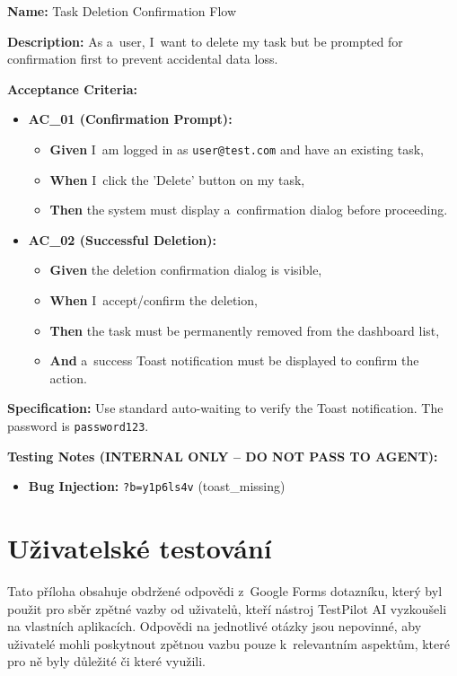 \documentclass[czech, ing, kiv, he, iso690numb, viewonly]{fasthesis}
\begin{document}
\begin{tcolorbox}[breakable, colback=gray!4, colframe=black!35, boxrule=0.4pt, arc=2pt, boxsep=1pt, left=3pt, right=3pt, top=2pt, bottom=2pt, before skip=6pt, after skip=6pt, fontupper=\small, title={US-08 -- Task Deletion Confirmation Flow}]
\textbf{Name:} Task Deletion Confirmation Flow

\textbf{Description:} As a~user, I~want to delete my task but be prompted for confirmation first to prevent accidental data loss.

\textbf{Acceptance Criteria:}
\begin{itemize}
    \item \textbf{AC\_01 (Confirmation Prompt):}
    \begin{itemize}
      \item \textbf{Given} I~am logged in as \texttt{user@test.com} and have an existing task,
      \item \textbf{When} I~click the 'Delete' button on my task,
      \item \textbf{Then} the system must display a~confirmation dialog before proceeding.
    \end{itemize}
    \item \textbf{AC\_02 (Successful Deletion):}
    \begin{itemize}
      \item \textbf{Given} the deletion confirmation dialog is visible,
      \item \textbf{When} I~accept/confirm the deletion,
      \item \textbf{Then} the task must be permanently removed from the dashboard list,
      \item \textbf{And} a~success Toast notification must be displayed to confirm the action.
    \end{itemize}
\end{itemize}

\textbf{Specification:} Use standard auto-waiting to verify the Toast notification. The password is \texttt{password123}.

\textbf{\textcolor{BrickRed}{Testing Notes (INTERNAL ONLY -- DO NOT PASS TO AGENT):}}
\begin{itemize}
    \item \textbf{Bug Injection:} \texttt{?b=y1p6ls4v} (toast\_missing)
\end{itemize}
\end{tcolorbox}

\chapter{Uživatelské testování}\label{app:userTesting}
Tato příloha obsahuje obdržené odpovědi z~Google Forms dotazníku,
který byl použit pro sběr zpětné vazby od uživatelů, kteří nástroj TestPilot AI vyzkoušeli 
na vlastních aplikacích. Odpovědi na jednotlivé otázky jsou nepovinné, 
aby uživatelé mohli poskytnout zpětnou vazbu pouze k~relevantním aspektům,
které pro ně byly důležité či které využili.
\end{document}
